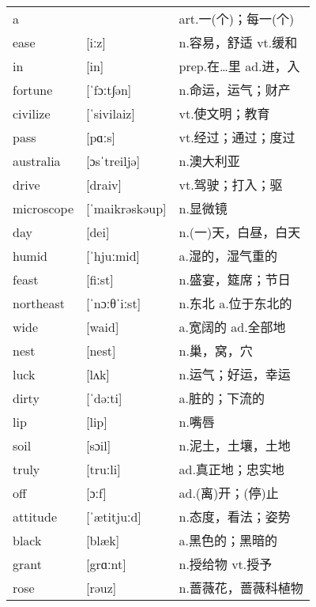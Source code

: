 \documentclass[a4paper]{article}
\begin{document}
\section{}
\begin{tabular}{l l l}

a &  & art.一(个)；每一(个) \\
ease & [iːz] & n.容易，舒适 vt.缓和 \\
in & [in] & prep.在…里 ad.进，入 \\
fortune & [ˈfɔːt∫ən] & n.命运，运气；财产 \\
civilize & [ˈsivilaiz] & vt.使文明；教育 \\
pass & [pɑːs] & vt.经过；通过；度过 \\
australia & [ɔsˈtreiljə] & n.澳大利亚 \\
drive & [draiv] & vt.驾驶；打入；驱 \\
microscope & [ˈmaikrəskəup] & n.显微镜 \\
day & [dei] & n.(一)天，白昼，白天 \\
humid & [ˈhjuːmid] & a.湿的，湿气重的 \\
feast & [fiːst] & n.盛宴，筵席；节日 \\
northeast & [ˈnɔːθˈiːst] & n.东北 a.位于东北的 \\
wide & [waid] & a.宽阔的 ad.全部地 \\
nest & [nest] & n.巢，窝，穴 \\
luck & [lʌk] & n.运气；好运，幸运 \\
dirty & [ˈdəːti] & a.脏的；下流的 \\
lip & [lip] & n.嘴唇 \\
soil & [sɔil] & n.泥土，土壤，土地 \\
truly & [truːli] & ad.真正地；忠实地 \\
off & [ɔːf] & ad.(离)开；(停)止 \\
attitude & [ˈætitjuːd] & n.态度，看法；姿势 \\
black & [blæk] & a.黑色的；黑暗的 \\
grant & [grɑːnt] & n.授给物 vt.授予 \\
rose & [rəuz] & n.蔷薇花，蔷薇科植物 \\

\end{tabular}
\end{document}
